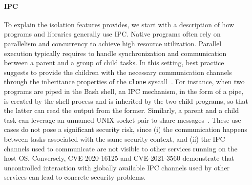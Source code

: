 \paragraph{IPC}
To explain the isolation features \natisand provides, we start with a
description of how programs and libraries generally use IPC.
Native programs often rely on parallelism and concurrency to achieve
high resource utilization. Parallel execution typically requires to
handle synchronization and communication between a parent and a group
of child tasks. In this setting, best practice suggests to provide the
children with the necessary communication channels through the
inheritance properties of the {\tt clone} syscall~\cite{doc-pipe}. For
instance, when two programs are piped in the Bash shell, an IPC
mechanism, in the form of a pipe, is created by the shell process and
is inherited by the two child programs, so that the latter can read
the output from the former. Similarly, a parent and a child task can
leverage an unnamed UNIX socket pair to share
messages~\cite{doc-socketpair}. These use cases do not pose a
significant security risk, since (i) the communication happens between
tasks associated with the same security context, and (ii) the IPC
channels used to communicate are not visible to other services running
on the host OS. Conversely, CVE-2020-16125 and CVE-2021-3560
demonstrate that uncontrolled interaction with globally available IPC
channels used by other services can lead to concrete security
problems.

